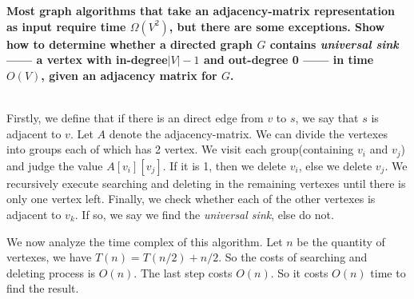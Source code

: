 
\chapter{}

\textbf{
Most graph algorithms that take an adjacency-matrix representation as input require time $\Omega(V^2)$, but there are some exceptions. Show how to determine whether a directed graph $G$ contains \emph{\textbf{universal sink}} ——\; a vertex with in-degree$|V|-1$ and out-degree 0 ——\; in time $O(V)$, given an adjacency matrix for $G$.
}

\hspace*{\fill} \\

Firstly, we define that if there is an direct edge from $v$ to $s$, we say that $s$ is adjacent to $v$.
Let $A$ denote the adjacency-matrix. We can divide the vertexes into groups each of which has 2 vertex. We visit each group(containing $v_i$ and $v_j$) and judge the value $A[v_i][v_j]$. If it is 1, then we delete $v_i$, else we delete $v_j$. We recursively execute searching and deleting in the remaining vertexes until there is only one vertex left. Finally, we check whether each of the other vertexes is adjacent to $v_k$. If so, we say we find the \emph{universal sink}, else do not.

We now analyze the time complex of this algorithm. Let $n$ be the quantity of vertexes, we have $T(n)=T(n/2)+n/2$. So the costs of searching and deleting process is $O(n)$. The last step costs $O(n)$. So it costs $O(n)$ time to find the result.




